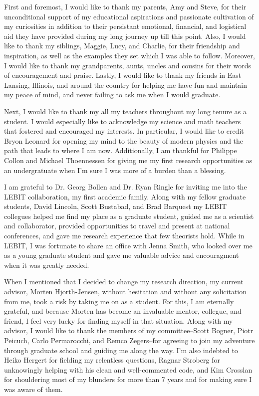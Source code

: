 \documentclass[../thesis.tex]{subfiles}
\begin{document}
First and foremost, I would like to thank my parents, Amy and Steve, for their unconditional support of my educational aspirations and passionate cultivation of my curiosities in addition to their persistant emotional, financial, and logistical aid they have provided during my long journey up till this point.  Also, I would like to thank my siblings, Maggie, Lucy, and Charlie, for their friendship and inspiration, as well as the examples they set which I was able to follow.  Moreover, I would like to thank my grandparents, aunts, uncles and cousins for their words of encouragement and praise.  Lastly, I would like to thank my friends in East Lansing, Illinois, and around the country for helping me have fun and maintain my peace of mind, and never failing to ask me when I would graduate.

Next, I would like to thank my all my teachers throughout my long tenure as a student.  I would especially like to acknowledge my science and math teachers that fostered and encouraged my interests.  In particular, I would like to credit Bryon Leonard for opening my mind to the beauty of modern physics and the path that leads to where I am now.  Additionally, I am thankful for Philippe Collon and Michael Thoennessen for giving me my first research opportunities as an undergratuate when I'm sure I was more of a burden than a blessing.

I am grateful to Dr. Georg Bollen and Dr. Ryan Ringle for inviting me into the LEBIT collaboration, my first academic family.  Along with my fellow graduate students, David Lincoln, Scott Bustabad, and Brad Barquest my LEBIT collegues helped me find my place as a graduate student, guided me as a scientist and collaborator, provided opportunities to travel and present at national conferences, and gave me research experience that few theorists hold.  While in LEBIT, I was fortunate to share an office with Jenna Smith, who looked over me as a young graduate student and gave me valuable advice and encouragment when it was greatly needed.

When I mentioned that I decided to change my research direction, my current advisor, Morten Hjorth-Jensen, without hesitation and without any solicitation from me, took a risk by taking me on as a student.  For this, I am eternally grateful, and because Morten has become an invaluable mentor, collegue, and friend, I feel very lucky for finding myself in that situation.  Along with my advisor, I would like to thank the members of my committee--Scott Bogner, Piotr Peicuch, Carlo Permarocchi, and Remco Zegers--for agreeing to join my adventure through graduate school and guiding me along the way.  I'm also indebted to Heiko Hergert for fielding my relentless questions, Ragnar Stroberg for unknowingly helping with his clean and well-commented code, and Kim Crosslan for shouldering most of my blunders for more than 7 years and for making sure I was aware of them.
\end{document}

